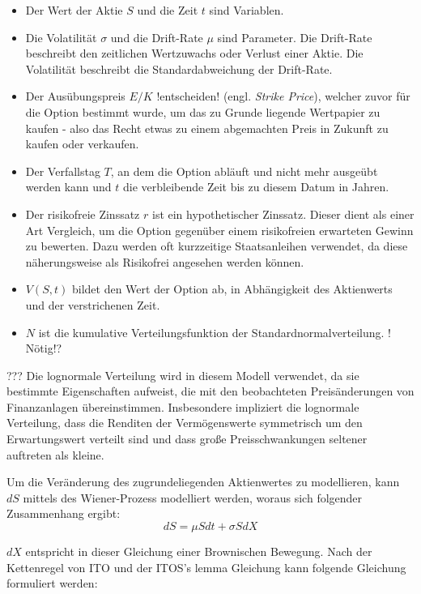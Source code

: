 \begin{itemize}
	\item Der Wert der Aktie $ S $ und die Zeit $ t $  sind Variablen.
	\item Die Volatilität $ \sigma $ und die Drift-Rate $ \mu $ sind Parameter. Die Drift-Rate beschreibt den zeitlichen Wertzuwachs oder Verlust einer Aktie. Die Volatilität beschreibt die Standardabweichung der Drift-Rate.
	\item Der Ausübungspreis $ E / K $ !entscheiden! (engl. \glqq \textit{Strike Price}\glqq{}), welcher zuvor für die Option bestimmt wurde, um das zu Grunde liegende Wertpapier zu kaufen -  also das Recht etwas zu einem abgemachten Preis in Zukunft zu kaufen oder verkaufen. 
	\item Der Verfallstag $ T $, an dem die Option abläuft und nicht mehr ausgeübt werden kann und $ t $ die verbleibende Zeit bis zu diesem Datum in Jahren.
	\item Der risikofreie Zinssatz $ r $ ist ein hypothetischer Zinssatz. Dieser dient als einer Art Vergleich, um die Option gegenüber einem risikofreien erwarteten Gewinn zu bewerten. Dazu werden oft kurzzeitige Staatsanleihen verwendet, da diese näherungsweise als Risikofrei angesehen werden können.
	\item $ V(S,t) $ bildet den Wert der Option ab, in Abhängigkeit des Aktienwerts und der verstrichenen Zeit.
	\item $ N $ ist die kumulative Verteilungsfunktion der Standardnormalverteilung. ! Nötig!?
\end{itemize}

??? 
Die lognormale Verteilung wird in diesem Modell verwendet, da sie bestimmte Eigenschaften aufweist, die mit den beobachteten Preisänderungen von Finanzanlagen übereinstimmen. Insbesondere impliziert die lognormale Verteilung, dass die Renditen der Vermögenswerte symmetrisch um den Erwartungswert verteilt sind und dass große Preisschwankungen seltener auftreten als kleine.

Um die Veränderung des zugrundeliegenden Aktienwertes zu modellieren, kann $ dS $ mittels des Wiener-Prozess modelliert werden, woraus sich folgender Zusammenhang ergibt:
\begin{equation}
	dS = \mu S dt + \sigma S dX
\end{equation}

$ dX $ entspricht in dieser Gleichung einer Brownischen Bewegung. Nach der Kettenregel von ITO und der ITOS's lemma Gleichung kann folgende Gleichung formuliert werden:

